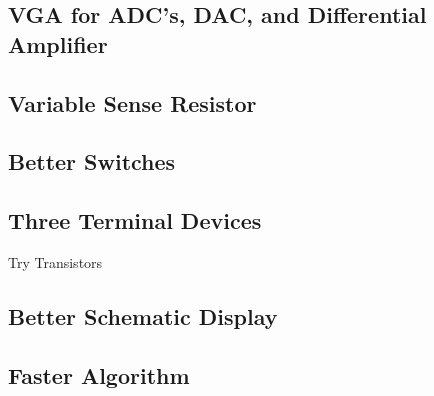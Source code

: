 \subsection{VGA for ADC's, DAC, and Differential Amplifier}
\subsection{Variable Sense Resistor}
\subsection{Better Switches}
\subsection{Three Terminal Devices}
Try Transistors
\subsection{Better Schematic Display}
\subsection{Faster Algorithm}